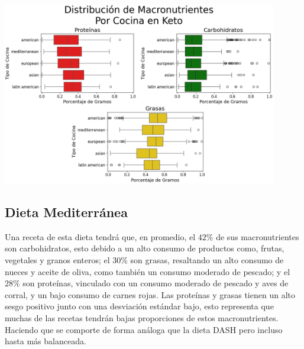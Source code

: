 \documentclass[12pt,a4paper]{article}
\begin{document}
{{            \begin{center}
                \includegraphics[width=0.9\textwidth]{Resources/EDA/Keto_2.png}
            \end{center}
        }

        \subsection{Dieta Mediterránea}
        {
            Una receta de esta dieta tendrá que, en promedio, el $42\%$ de sus 
            macronutrientes son carbohidratos, esto debido a un alto consumo de 
            productos como, frutas, vegetales y granos enteros; el $30\%$ son 
            grasas, resaltando un alto consumo de nueces y aceite de oliva, como 
            también un consumo moderado de pescado; y el $28\%$ son proteínas, 
            vinculado con un consumo moderado de pescado y aves de corral, y un 
            bajo consumo de carnes rojas. Las proteínas y grasas tienen un alto 
            sesgo positivo junto con una desviación estándar bajo, esto representa 
            que muchas de las recetas tendrán bajas proporciones de estos macronutrientes. 
            Haciendo que se comporte de forma análoga que la dieta DASH pero incluso 
            hasta más balanceada.\\

}}
\end{document}
